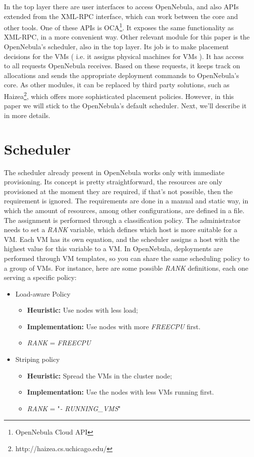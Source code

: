 In the top layer there are user interfaces to access OpenNebula, and also APIs extended from the XML-RPC interface, which can work between the core and other tools. One of these APIs is  OCA\footnote{OpenNebula Cloud API}. It exposes the same functionality as XML-RPC, in a more convenient way. Other relevant module for this paper is the OpenNebula's scheduler, also in the top layer. Its job is to make placement decisions for the VMs ( i.e. it assigns physical machines for VMs ). It has access to all requests OpenNebula receives. Based on these requests, it keeps track on allocations and sends the appropriate deployment commands to OpenNebula's core. As other modules, it can be replaced by third party solutions, such as Haizea\footnote{http://haizea.cs.uchicago.edu/},  which offers more sophisticated placement policies. However, in this paper we will stick to the OpenNebula's default scheduler. Next, we'll describe it in more details.

\section{Scheduler}

The scheduler already present in OpenNebula works only with immediate provisioning. Its concept is pretty straightforward, the resources are only provisioned at the moment they are required, if that's not possible, then the requirement is ignored. The requirements are done in a manual and static way, in which the amount of resources, among other configurations, are defined in a file. The assignment is performed through a classification policy.  The administrator needs to set a \textit{RANK} variable, which defines which host is more suitable for a VM. Each VM has its own  equation, and the scheduler assigns a host with the highest value for this variable to a VM. In OpenNebula, deployments are performed through VM templates, so you can share the same scheduling policy  to a group of VMs. For instance, here are some possible \textit{RANK} definitions, each one serving a specific policy:

\begin{itemize}
 \item Load-aware Policy
 \begin{itemize}
   \item \textbf{Heuristic:} Use nodes with less load;
   \item \textbf{Implementation:} Use nodes with more \textit{FREECPU} first.
    \item \textit{RANK} = \textit{FREECPU}

 \end{itemize}

  \item Striping policy
  \begin{itemize}
   \item \textbf{Heuristic:} Spread the VMs in the cluster node;
   \item \textbf{Implementation:} Use the nodes with less VMs running first.
   \item \textit{RANK} = "\textit{- RUNNING\_VMS}"
  \end{itemize}

\end{itemize}

